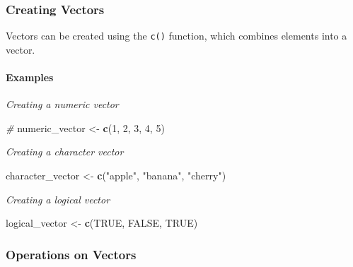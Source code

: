 \documentclass[
]{book}
\newenvironment{Shaded}{\begin{snugshade}}{\end{snugshade}}
\newcommand{\CommentTok}[1]{\textcolor[rgb]{0.56,0.35,0.01}{\textit{#1}}}
\newcommand{\ConstantTok}[1]{\textcolor[rgb]{0.56,0.35,0.01}{#1}}
\newcommand{\DecValTok}[1]{\textcolor[rgb]{0.00,0.00,0.81}{#1}}
\newcommand{\FunctionTok}[1]{\textcolor[rgb]{0.13,0.29,0.53}{\textbf{#1}}}
\newcommand{\NormalTok}[1]{#1}
\newcommand{\OtherTok}[1]{\textcolor[rgb]{0.56,0.35,0.01}{#1}}
\newcommand{\StringTok}[1]{\textcolor[rgb]{0.31,0.60,0.02}{#1}}
\begin{document}
\hypertarget{creating-vectors}{%
\subsubsection*{Creating Vectors}\label{creating-vectors}}

Vectors can be created using the \texttt{c()} function, which combines elements into a vector.

\hypertarget{examples-2}{%
\paragraph*{Examples}\label{examples-2}}

\emph{Creating a numeric vector}

\begin{Shaded}
\begin{Highlighting}[]
\CommentTok{\# }
\NormalTok{numeric\_vector }\OtherTok{\textless{}{-}} \FunctionTok{c}\NormalTok{(}\DecValTok{1}\NormalTok{, }\DecValTok{2}\NormalTok{, }\DecValTok{3}\NormalTok{, }\DecValTok{4}\NormalTok{, }\DecValTok{5}\NormalTok{)}
\end{Highlighting}
\end{Shaded}

\emph{Creating a character vector}

\begin{Shaded}
\begin{Highlighting}[]

\NormalTok{character\_vector }\OtherTok{\textless{}{-}} \FunctionTok{c}\NormalTok{(}\StringTok{"apple"}\NormalTok{, }\StringTok{"banana"}\NormalTok{, }\StringTok{"cherry"}\NormalTok{)}
\end{Highlighting}
\end{Shaded}

\emph{Creating a logical vector}

\begin{Shaded}
\begin{Highlighting}[]
\NormalTok{logical\_vector }\OtherTok{\textless{}{-}} \FunctionTok{c}\NormalTok{(}\ConstantTok{TRUE}\NormalTok{, }\ConstantTok{FALSE}\NormalTok{, }\ConstantTok{TRUE}\NormalTok{)}
\end{Highlighting}
\end{Shaded}

\hypertarget{operations-on-vectors}{%
\subsubsection*{Operations on Vectors}\label{operations-on-vectors}}
\end{document}
